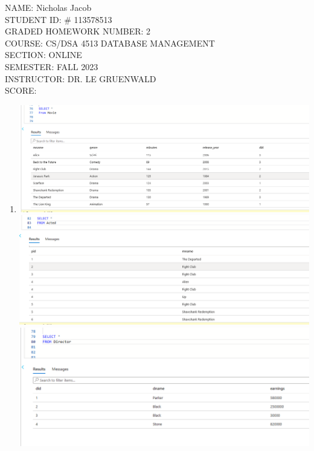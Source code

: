 \documentclass[11pt]{article}
\author{}
\title{}
\begin{document}
{\Large
\noindent NAME:  Nicholas Jacob\\ 
STUDENT ID: \# 113578513\\
GRADED HOMEWORK NUMBER: 2\\
COURSE: CS/DSA 4513 DATABASE MANAGEMENT\\ 
SECTION: ONLINE\\SEMESTER: FALL 2023\\
INSTRUCTOR:  DR. LE GRUENWALD\\
 SCORE:}

\newpage
\begin{enumerate}
\item \includegraphics[width = \textwidth]{checktables1.png} 
\includegraphics[width = \textwidth]{checktables2.png}
\includegraphics[width = \textwidth]{checktables3.png}

\end{enumerate}
\end{document}
